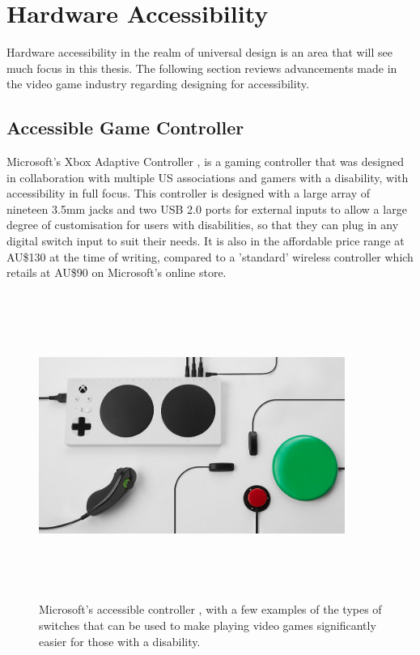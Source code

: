 \section{Hardware Accessibility}

Hardware accessibility in the realm of universal design is an area that will see much focus in this thesis. %
The following section reviews advancements made in the video game industry regarding designing for accessibility.

\subsection{Accessible Game Controller}

Microsoft's Xbox Adaptive Controller \cite{adaptive}, is a gaming controller that was designed in collaboration with multiple US associations and gamers with a disability, with accessibility in full focus.
This controller is designed with a large array of nineteen 3.5mm jacks and two USB 2.0 ports for external inputs \cite{adaptive} to allow a large degree of customisation for users with disabilities, so that they can plug in any digital switch input to suit their needs.
It is also in the affordable price range at AU\$130 \cite{accessiblecontroller} at the time of writing, compared to a 'standard' wireless controller which retails at AU\$90 \cite{standardcontroller} on Microsoft's online store.

\begin{figure} [h]
    \centering
    \includegraphics[width=10cm,height=10cm,keepaspectratio]{Figures/accessible_controller.png}
    \caption{Microsoft's accessible controller \cite{adaptive}, with a few examples of the types of switches that can be used to make playing video games significantly easier for those with a disability.}
    \label{fig:Jellybean}
\end{figure}

